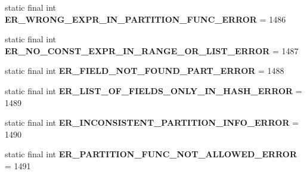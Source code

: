 \begin{DoxyCompactItemize}
\item 
\mbox{\label{classcom_1_1mysql_1_1jdbc_1_1_mysql_error_numbers_a272ca1f9b3d8072aceccc7b10acba3ba}} 
static final int {\bfseries E\+R\+\_\+\+W\+R\+O\+N\+G\+\_\+\+E\+X\+P\+R\+\_\+\+I\+N\+\_\+\+P\+A\+R\+T\+I\+T\+I\+O\+N\+\_\+\+F\+U\+N\+C\+\_\+\+E\+R\+R\+OR} = 1486
\item 
\mbox{\label{classcom_1_1mysql_1_1jdbc_1_1_mysql_error_numbers_a43b45f4544af0045c09e480f7c5f94c5}} 
static final int {\bfseries E\+R\+\_\+\+N\+O\+\_\+\+C\+O\+N\+S\+T\+\_\+\+E\+X\+P\+R\+\_\+\+I\+N\+\_\+\+R\+A\+N\+G\+E\+\_\+\+O\+R\+\_\+\+L\+I\+S\+T\+\_\+\+E\+R\+R\+OR} = 1487
\item 
\mbox{\label{classcom_1_1mysql_1_1jdbc_1_1_mysql_error_numbers_a58058254b8ecd8cdb853a8214cf9bbf8}} 
static final int {\bfseries E\+R\+\_\+\+F\+I\+E\+L\+D\+\_\+\+N\+O\+T\+\_\+\+F\+O\+U\+N\+D\+\_\+\+P\+A\+R\+T\+\_\+\+E\+R\+R\+OR} = 1488
\item 
\mbox{\label{classcom_1_1mysql_1_1jdbc_1_1_mysql_error_numbers_a37f1e59317f6ce4dd8d6af7fd57c8ec5}} 
static final int {\bfseries E\+R\+\_\+\+L\+I\+S\+T\+\_\+\+O\+F\+\_\+\+F\+I\+E\+L\+D\+S\+\_\+\+O\+N\+L\+Y\+\_\+\+I\+N\+\_\+\+H\+A\+S\+H\+\_\+\+E\+R\+R\+OR} = 1489
\item 
\mbox{\label{classcom_1_1mysql_1_1jdbc_1_1_mysql_error_numbers_a2e142455387f15d7279fd734719e02df}} 
static final int {\bfseries E\+R\+\_\+\+I\+N\+C\+O\+N\+S\+I\+S\+T\+E\+N\+T\+\_\+\+P\+A\+R\+T\+I\+T\+I\+O\+N\+\_\+\+I\+N\+F\+O\+\_\+\+E\+R\+R\+OR} = 1490
\item 
\mbox{\label{classcom_1_1mysql_1_1jdbc_1_1_mysql_error_numbers_a696a8af6159d9e8dcc158132699244b0}} 
static final int {\bfseries E\+R\+\_\+\+P\+A\+R\+T\+I\+T\+I\+O\+N\+\_\+\+F\+U\+N\+C\+\_\+\+N\+O\+T\+\_\+\+A\+L\+L\+O\+W\+E\+D\+\_\+\+E\+R\+R\+OR} = 1491
\item 
\mbox{\label{classcom_1_1mysql_1_1jdbc_1_1_mysql_error_numbers_a353d041a6a6b0c20c5cc0c207f829ed6}} 

\end{DoxyCompactItemize}
